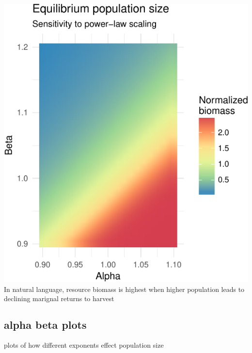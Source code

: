 \documentclass[]{article}
\begin{document}
\includegraphics{eq_pop_files/figure-latex/unnamed-chunk-5-1.pdf} In
natural language, resource biomass is highest when higher population
leads to declining marignal returns to harvest

\subsection{alpha beta plots}\label{alpha-beta-plots}

plots of how different exponents effect population size
\end{document}
